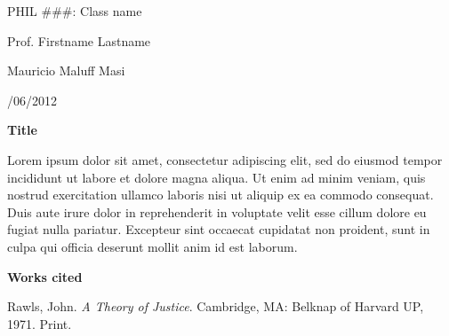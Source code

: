 \documentclass[letter,12pt]{article}
\begin{document}
\begin{spacing}{1}
\noindent PHIL \#\#\#: Class name

\noindent Prof. Firstname Lastname

\noindent Mauricio Maluff Masi

/06/2012 \\

\end{spacing}

{\centering
\textbf{Title}

}

Lorem ipsum dolor sit amet, consectetur adipiscing elit, sed do eiusmod tempor incididunt ut labore et dolore magna aliqua. Ut enim ad minim veniam, quis nostrud exercitation ullamco laboris nisi ut aliquip ex ea commodo consequat. Duis aute irure dolor in reprehenderit in voluptate velit esse cillum dolore eu fugiat nulla pariatur. Excepteur sint occaecat cupidatat non proident, sunt in culpa qui officia deserunt mollit anim id est laborum.

{\centering
\textbf{Works cited}

}

Rawls, John. \emph{A Theory of Justice}. Cambridge, MA: Belknap of Harvard UP, 1971. Print.
\end{document}
